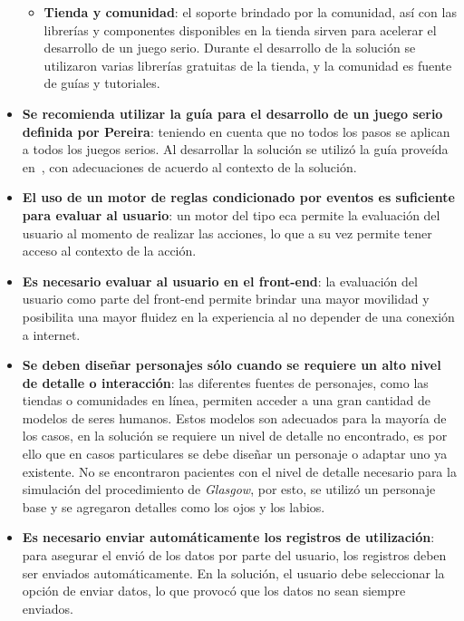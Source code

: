 \begin{itemize}
\begin{itemize}
    \item \textbf{Tienda y comunidad}: el soporte brindado  por la comunidad,
        así con las librerías y componentes disponibles en la tienda sirven para
        acelerar el desarrollo de un juego serio. Durante el desarrollo de la
        solución se utilizaron varias librerías gratuitas de la tienda, y la
        comunidad es fuente de guías y tutoriales.

    \end{itemize}


\item \textbf{Se recomienda utilizar la guía para el desarrollo de un juego
        serio definida por Pereira\cite{pereira2009design}}: teniendo en cuenta
    que no todos los pasos se aplican a todos los juegos serios. Al desarrollar
    la solución se utilizó la guía proveída en~\cite{pereira2009design}, con
    adecuaciones de acuerdo al contexto de la solución.

\item \textbf{El uso de un motor de reglas condicionado por eventos es
        suficiente para evaluar al usuario}: un motor del tipo \gls{eca} permite
    la evaluación del usuario al momento de realizar las acciones, lo que a su
    vez permite tener acceso al contexto de la acción. 

\item \textbf{Es necesario evaluar al usuario en el front-end}: la evaluación
    del usuario como parte del front-end permite brindar una mayor movilidad y
    posibilita una mayor fluidez en la experiencia al no depender de una
    conexión a internet. 



\item \textbf{Se deben diseñar personajes sólo cuando se requiere un alto nivel
        de detalle o interacción}: las diferentes fuentes de personajes, como
    las tiendas o comunidades en línea, permiten acceder a una gran cantidad de
    modelos de seres humanos. Estos modelos son adecuados para la mayoría de los
    casos, en la solución se requiere un nivel de detalle no encontrado, es por
    ello que en casos particulares se debe diseñar un personaje o adaptar uno ya
    existente. No se encontraron pacientes con el nivel de detalle necesario
    para la simulación del procedimiento de \emph{Glasgow}, por esto, se utilizó
    un personaje base y se agregaron detalles como los ojos y los labios.

\item \textbf{Es necesario enviar automáticamente los registros de utilización}:
    para asegurar el envió de los datos por parte del usuario, los registros
    deben ser enviados automáticamente. En la solución, el usuario debe
    seleccionar la opción de enviar datos, lo que provocó que los datos no sean
    siempre enviados.

\end{itemize}

